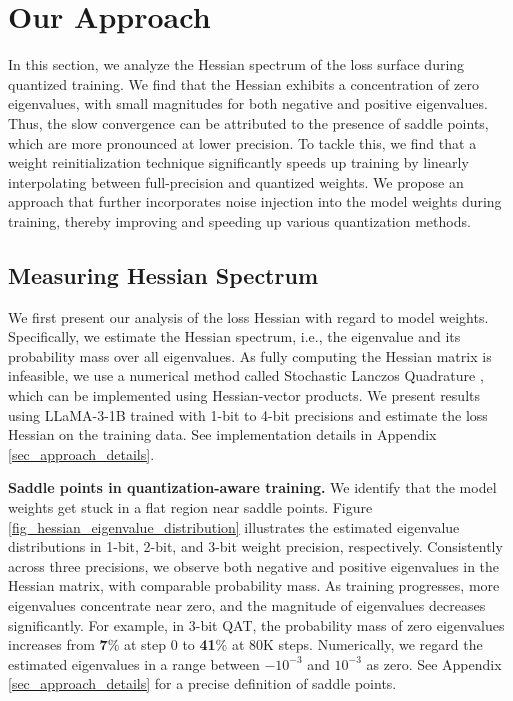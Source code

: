 \documentclass{article}
\theoremstyle{definition}
\begin{document}
\section{Our Approach}\label{sec_approach}

In this section, we analyze the Hessian spectrum of the loss surface during quantized training. We find that the Hessian exhibits a concentration of zero eigenvalues, with small magnitudes for both negative and positive eigenvalues. Thus, the slow convergence can be attributed to the presence of saddle points, which are more pronounced at lower precision. To tackle this, we find that a weight reinitialization technique significantly speeds up training by linearly interpolating between full-precision and quantized weights. We propose an approach that further incorporates noise injection into the model weights during training, thereby improving and speeding up various quantization methods. 

\subsection{Measuring Hessian Spectrum}\label{sec:measure_hessian_spectrum}


We first present our analysis of the loss Hessian with regard to model weights. Specifically, we estimate the Hessian spectrum, i.e., the eigenvalue and its probability mass over all eigenvalues.
As fully computing the Hessian matrix is infeasible, we use a numerical method called Stochastic Lanczos Quadrature \citep{bai1996some,chen2021analysis}, which can be implemented using Hessian-vector products. We present results using LLaMA-3-1B trained with 1-bit to 4-bit precisions and estimate the loss Hessian on the training data. See implementation details in Appendix \ref{sec_approach_details}.

\textbf{Saddle points in quantization-aware training.}
We identify that the model weights get stuck in a flat region near saddle points. Figure \ref{fig_hessian_eigenvalue_distribution} illustrates the estimated eigenvalue distributions in 1-bit, 2-bit, and 3-bit weight precision, respectively.  Consistently across three precisions, we observe both negative and positive eigenvalues in the Hessian matrix, with comparable probability mass.
As training progresses, more eigenvalues concentrate near zero, and the magnitude of eigenvalues decreases significantly. For example, in 3-bit QAT, the probability mass of zero eigenvalues increases from \textbf{7}\% at step 0 to \textbf{41}\% at 80K steps. {Numerically, we regard the estimated eigenvalues in a range between $-10^{-3}$ and $10^{-3}$ as zero.}
See Appendix \ref{sec_approach_details} for a precise definition of saddle points.
\end{document}
